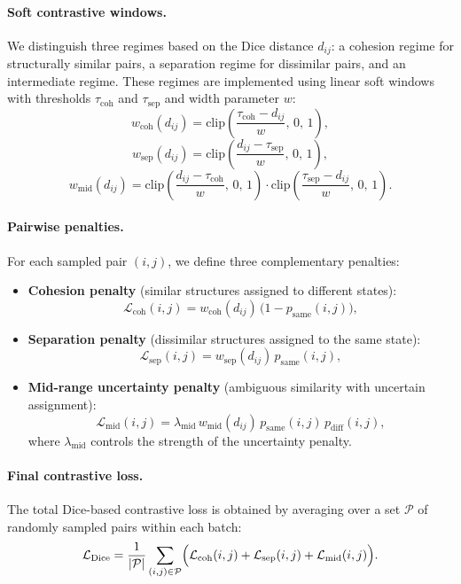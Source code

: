 \documentclass[
    aps,
    prl,
    reprint,
    superscriptaddress,
    amsmath,amssymb,
    nofootinbib,
    floatfix
]{revtex4-2}
\begin{document}
\paragraph{Soft contrastive windows.}
We distinguish three regimes based on the Dice distance $d_{ij}$: a cohesion regime for structurally similar pairs, a separation regime for dissimilar pairs, and an intermediate regime. These regimes are implemented using linear soft windows with thresholds $\tau_{\mathrm{coh}}$ and $\tau_{\mathrm{sep}}$ and width parameter $w$:
\[
w_{\mathrm{coh}}(d_{ij}) =
\mathrm{clip}\!\left(\frac{\tau_{\mathrm{coh}} - d_{ij}}{w},\,0,\,1\right),
\]
\[
w_{\mathrm{sep}}(d_{ij}) =
\mathrm{clip}\!\left(\frac{d_{ij} - \tau_{\mathrm{sep}}}{w},\,0,\,1\right),
\]
\[
w_{\mathrm{mid}}(d_{ij}) =
\mathrm{clip}\!\left(\frac{d_{ij} - \tau_{\mathrm{coh}}}{w},\,0,\,1\right)
\cdot
\mathrm{clip}\!\left(\frac{\tau_{\mathrm{sep}} - d_{ij}}{w},\,0,\,1\right).
\]

\paragraph{Pairwise penalties.}
For each sampled pair $(i,j)$, we define three complementary penalties:
\begin{itemize}
\item \textbf{Cohesion penalty} (similar structures assigned to different states):
\[
\mathcal{L}_{\mathrm{coh}}(i,j)
=
w_{\mathrm{coh}}(d_{ij}) \, \bigl(1 - p_{\mathrm{same}}(i,j)\bigr),
\]
\item \textbf{Separation penalty} (dissimilar structures assigned to the same state):
\[
\mathcal{L}_{\mathrm{sep}}(i,j)
=
w_{\mathrm{sep}}(d_{ij}) \, p_{\mathrm{same}}(i,j),
\]
\item \textbf{Mid-range uncertainty penalty} (ambiguous similarity with uncertain assignment):
\[
\mathcal{L}_{\mathrm{mid}}(i,j)
=
\lambda_{\mathrm{mid}}\,
w_{\mathrm{mid}}(d_{ij})\,
p_{\mathrm{same}}(i,j)\, p_{\mathrm{diff}}(i,j),
\]
where $\lambda_{\mathrm{mid}}$ controls the strength of the uncertainty penalty.
\end{itemize}

\paragraph{Final contrastive loss.}
The total Dice-based contrastive loss is obtained by averaging over a set $\mathcal{P}$ of randomly sampled pairs within each batch:
\[
\mathcal{L}_{\mathrm{Dice}}
=
\frac{1}{|\mathcal{P}|}
\sum_{(i,j)\in\mathcal{P}}
\Bigl(
\mathcal{L}_{\mathrm{coh}}(i,j)
+
\mathcal{L}_{\mathrm{sep}}(i,j)
+
\mathcal{L}_{\mathrm{mid}}(i,j)
\Bigr).
\]
\end{document}

